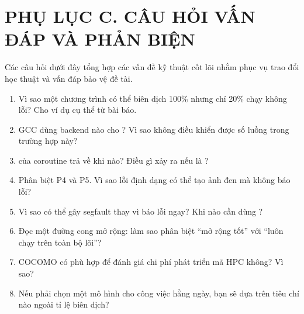 \clearpage
\section*{PHỤ LỤC C. CÂU HỎI VẤN ĐÁP VÀ PHẢN BIỆN}

Các câu hỏi dưới đây tổng hợp các vấn đề kỹ thuật cốt lõi nhằm phục vụ trao đổi
học thuật và vấn đáp bảo vệ đề tài.

\begin{enumerate}
  \item Vì sao một chương trình có thể biên dịch 100\% nhưng chỉ 20\% chạy không
        lỗi? Cho ví dụ cụ thể từ bài báo.
  \item GCC dùng backend nào cho ? Vì sao
         không điều khiển được số luồng trong trường hợp
        này?
  \item {} của coroutine trả về  khi nào? Điều gì xảy ra
        nếu  là ?
  \item Phân biệt P4 và P5. Vì sao lỗi định dạng có thể tạo ảnh đen mà không báo
        lỗi?
  \item Vì sao  có thể gây segfault thay vì báo lỗi ngay? Khi
        nào cần dùng ?
  \item Đọc một đường cong mở rộng: làm sao phân biệt “mở rộng tốt” với “luôn
        chạy trên toàn bộ lõi”?
  \item COCOMO có phù hợp để đánh giá chi phí phát triển mã HPC không? Vì sao?
  \item Nếu phải chọn một mô hình cho công việc hằng ngày, bạn sẽ dựa trên tiêu
        chí nào ngoài tỉ lệ biên dịch?
\end{enumerate}
